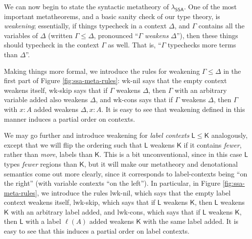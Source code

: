 \documentclass[acmsmall,screen,review]{acmart}
\newcommand{\ms}[1]{\ensuremath{\mathsf{#1}}}
\newcommand{\bhyp}[2]{#1 : #2}
\newcommand{\lhyp}[2]{#1(#2)}
\newcommand{\brle}[1]{{\textsf{#1}}}
\newcommand{\isotopessa}{\(\lambda_{\ms{SSA}}\)}
\begin{document}
We can now begin to state the syntactic metatheory of \isotopessa{}. One of the
most important metatheorems, and a basic sanity check of our type theory, is
\emph{weakening}; essentially, if things typecheck in a context $\Delta$, and
$\Gamma$ contains all the variables of $\Delta$ (written $\Gamma \leq \Delta$,
pronounced ``$\Gamma$ \emph{weakens} $\Delta$''), then these things should
typecheck in the context $\Gamma$ as well. That is, ``$\Gamma$ typechecks more
terms than $\Delta$''.
 
Making things more formal, we introduce the rules for weakening $\Gamma \leq \Delta$ in the first
part of Figure \ref{fig:ssa-meta-rules}: \brle{wk-nil} says that the empty context weakens itself,
\brle{wk-skip} says that if $\Gamma$ weakens $\Delta$, then $\Gamma$ with an arbitrary variable
added also weakens $\Delta$, and \brle{wk-cons} says that if $\Gamma$ weakens $\Delta$, then
$\Gamma$ with $\bhyp{x}{A}$ added weakens $\Delta, \bhyp{x}{A}$. It is easy to see that weakening
defined in this manner induces a partial order on contexts.

We may go further and introduce weakening for \emph{label contexts} $\ms{L} \leq \ms{K}$
analogously, except that we will flip the ordering such that $\ms{L}$ weakens $\ms{K}$ if it
contains \emph{fewer}, rather than \emph{more}, labels than $\ms{K}$. This is a bit unconventional,
since in this case $\ms{L}$ types \emph{fewer} regions than $\ms{K}$, but it will make our
metatheory and denotational semantics come out more clearly, since it corresponds to label-contexts
being ``on the right'' (with variable contexts ``on the left''). In particular, in Figure
\ref{fig:ssa-meta-rules}, we introduce the rules \brle{lwk-nil}, which says that the empty label
context weakens itself, \brle{lwk-skip}, which says that if $\ms{L}$ weakens $\ms{K}$, then $\ms{L}$
weakens $\ms{K}$ with an arbitrary label added, and \brle{lwk-cons}, which says that if $\ms{L}$
weakens $\ms{K}$, then $\ms{L}$ with a label $\lhyp{\ell}{A}$ added weakens $\ms{K}$ with the same
label added. It is easy to see that this induces a partial order on label contexts.
\end{document}
